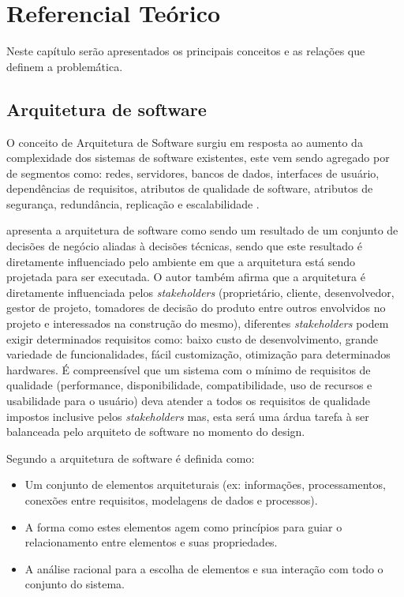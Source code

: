 \chapter{Referencial Teórico}
Neste capítulo serão apresentados os principais conceitos e as relações que definem a problemá́tica.
\section{Arquitetura de software}
O conceito de Arquitetura de Software surgiu em resposta ao aumento da complexidade dos sistemas de software existentes, este vem sendo agregado por de segmentos como: redes, servidores, bancos de dados, interfaces de usuário, dependências de requisitos, atributos de qualidade de software, atributos de segurança, redundância, replicação e escalabilidade \cite{hanschke2015integrating}.

\cite{bass2007software} apresenta a arquitetura de software como sendo um resultado de um conjunto de decisões de negócio aliadas à decisões técnicas, sendo que este resultado é diretamente influenciado pelo ambiente em que a arquitetura está sendo projetada para ser executada. O autor também afirma que a arquitetura é diretamente influenciada pelos \textit{stakeholders} (proprietário, cliente, desenvolvedor, gestor de projeto, tomadores de decisão do produto entre outros envolvidos no projeto e interessados na construção do mesmo), diferentes \textit{stakeholders} podem exigir determinados requisitos como: baixo custo de desenvolvimento, grande variedade de funcionalidades, fácil customização, otimização para determinados hardwares. É compreensível que um sistema com o mínimo de requisitos de qualidade (performance, disponibilidade, compatibilidade, uso de recursos e usabilidade para o usuário) deva atender a todos os requisitos de qualidade impostos inclusive pelos \textit{stakeholders} mas, esta será uma árdua tarefa à ser balanceada pelo arquiteto de software no momento do design.

Segundo \cite{babar2014making} a arquitetura de software é definida como:
\begin{itemize}
\item Um conjunto de elementos arquiteturais (ex: informações, processamentos, conexões entre requisitos, modelagens de dados e processos).
\item A forma como estes elementos agem como princípios para guiar  o relacionamento entre elementos e suas propriedades.
\item A análise racional para a escolha de elementos e sua interação com todo o conjunto do sistema.
\end{itemize}  

